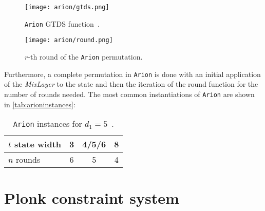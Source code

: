 \documentclass[12pt, a4paper]{report}
\begin{document}
\begin{figure}[H]
  \begin{center}
    \texttt{[image: arion/gtds.png]}
  \end{center}
  \caption{\texttt{Arion} GTDS function~\cite[Fig.~1.21]{bouvier}.}\label{fig:gtds}
\end{figure}

\begin{figure}[H]
  \begin{center}
    \texttt{[image: arion/round.png]}
  \end{center}
  \caption{$r$-th round of the \texttt{Arion} permutation.}\label{fig:arion}
\end{figure}

Furthermore, a complete permutation in \texttt{Arion} is done with an initial application of the \textit{MixLayer} to the state and then the iteration of the round function for the number of rounds needed.
The most common instantiations of \texttt{Arion} are shown in \autoref{tab:arioninstances}:
\begin{table}[H]
  \caption{\texttt{Arion} instances for $d_1 = 5$~\cite[Tab.~3]{arion}.}\label{tab:arioninstances}
  \begin{center}
    \begin{tabular}{|l|c|c|c|}
      \hline
      $t$ state width & 3 & 4/5/6 & 8 \\
      \hline
      $n$ rounds & 6 & 5 & 4 \\
      \hline
    \end{tabular}
  \end{center}
\end{table}

\section{\textsf{Plonk} constraint system}\label{sec:plonk}
\end{document}
